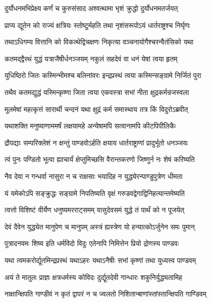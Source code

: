 
\twolineshloka
{दुर्योधनमभिप्रेक्ष्य कर्णं च कुरुसंसाद}
{अश्वत्थामा भृशं क्रुद्धो दुर्योधनमतर्जयत्}


\twolineshloka
{प्राप्य द्यूतेन को राज्यं क्षत्रियः स्तोष्टुर्महति}
{तथा नृशंसरूपोऽयं धार्तराष्ट्रश्च निर्घृणः}


\twolineshloka
{तथाऽधिगम्य वित्तानि को विकत्थेद्विचक्षणः}
{निकृत्या वञ्चनायोगैश्चरन्वैतंसिको यथा}


\twolineshloka
{कतमद्द्वैरथं युद्धं यत्राजैषीर्धनञ्जयम्}
{नकुलं सहदेवं वा धनं येषां त्वया हृतम्}


\twolineshloka
{युधिष्ठिरो जितः कस्मिन्भीमश्च बलिनांवरः}
{इन्द्रप्रस्थं त्वया कस्मिन्सङ्ग्रामे निर्जितं पुरा}


\twolineshloka
{तथैव कतमद्युद्धं यस्मिन्कृष्णा जिता त्वया}
{एकवस्त्रा सभां नीता क्षुद्रकर्मन्रजस्वला}


\twolineshloka
{मूलमेषां महत्कृत्तं सारार्थी चन्दनं यथा}
{क्षुद्रं कर्म समास्थाय तत्र किं विदुरोऽब्रवीत्}


\twolineshloka
{यथाशक्ति मनुष्याणाममर्षं लक्षयामहे}
{अन्येषामपि सत्वानामपि कीटपिपीलिकैः}


\twolineshloka
{द्रौपद्याः सम्परिक्लेशं न क्षन्तुं पाण्डवोऽर्हति}
{क्षयाय धार्तराष्ट्राणां प्रादुर्भूतो धनञ्जयः}


\twolineshloka
{त्वं पुनः पण्डितो भूत्वा ह्याचार्यं क्षेप्तुमिच्छसि}
{वैरान्तकरणो जिष्णुर्न नः शेषं करिष्यति}


\twolineshloka
{नैव देवा न गन्धर्वा नासुरा न च राक्षसाः}
{भयादिह न युद्ध्येरन्पाण्डुपुत्रेण धीमता}


\twolineshloka
{यं यमेकोऽपि सङ्क्रुद्धः सङ्ग्रामे निपतिष्यति}
{वृक्षं गरुडवद्वेगाद्विनिहत्यान्तमेष्यति}


\twolineshloka
{त्वत्तो विशिष्टं वीर्येण धनुष्यमरराट्समम्}
{वासुदेवसमं युद्धे तं पार्थं को न पूजयेत्}


\twolineshloka
{देवं दैवेन युद्ध्येत मानुपेण च मानुपम्}
{अस्त्रं ह्यस्त्रेण यो हन्यात्कोऽर्जुनेन समः पुमान्}


\twolineshloka
{पुत्रादनवमः शिष्य इति धर्मविदो विदुः}
{एतेनापि निमित्तेन प्रियो द्रोणस्य पाण्डवः}


\twolineshloka
{यथा त्वमकरोर्द्यूतमिन्द्रप्रस्थं यथाऽहरः}
{यथाऽनैषीः सभां कृष्णां तथा युध्यस्व पाण्डवम्}


\twolineshloka
{अयं ते मातुलः प्राज्ञः क्षत्रधर्मस्य कोविदः}
{दुर्द्यूतदेवी गान्धारः शकुनिर्युद्ध्यतामिह}


\twolineshloka
{नाक्षान्क्षिपति गाण्डीवं न कृतं द्वापरं न च}
{ज्वलतो निशितान्बाणांस्तांस्तान्क्षिपति गाण्डिवम्}


